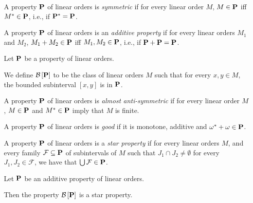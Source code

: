 \begin{definition}
  A property $\mathbf{P}$ of linear orders is \emph{symmetric} if for every linear order $M$,
  $M \in \mathbf{P}$ iff $M^\ast \in \mathbf{P}$, i.e., if $\mathbf{P}^\ast = \mathbf{P}$.
\end{definition}

\begin{definition}
  A property $\mathbf{P}$ of linear orders is an \emph{additive property} if for every linear orders $M_1$ and $M_2$,
  $M_1 + M_2 \in \mathbf{P}$ iff $M_1, M_2 \in \mathbf{P}$, i.e., if $\mathbf{P} + \mathbf{P} = \mathbf{P}$.
\end{definition}

\begin{definition}
  Let $\mathbf{P}$ be a property of linear orders.

  We define $\mathcal{B} \left[ {{\mathbf{P}}} \right]$ to be the class of linear orders $M$ such that for every $x, y \in M$,
  the bounded subinterval $[x, y]$ is in $\mathbf{P}$.
\end{definition}

\begin{definition}
  A property $\mathbf{P}$ of linear orders is \emph{almost anti-symmetric}
  if for every linear order $M$,
  $M \in \mathbf{P}$ and $M^\ast \in \mathbf{P}$ imply that $M$ is finite.
\end{definition}

\begin{definition}
  A property $\mathbf{P}$ of linear orders is \emph{good} if it is
  monotone, additive and $\omega^\ast + \omega \in \mathbf{P}$.
\end{definition}

\begin{definition}
  A property $\mathbf{P}$ of linear orders is a \emph{star property} if
  for every linear orders $M$, and every family $\mathcal{F} \subseteq \mathbf{P}$
  of subintervals of $M$ such that $J_1 \cap J_2 \ne \emptyset$
  for every $J_1, J_2 \in \mathcal{F}$, we have that
  $\bigcup \mathcal{F} \in \mathbf{P}$.
\end{definition}


\begin{lemma}\label{star-lemma}
  Let $\mathbf{P}$ be an additive property of linear orders.

  Then the property $\mathcal{B} \left[ {{\mathbf{P}}} \right]$ is a star property.
\end{lemma}

